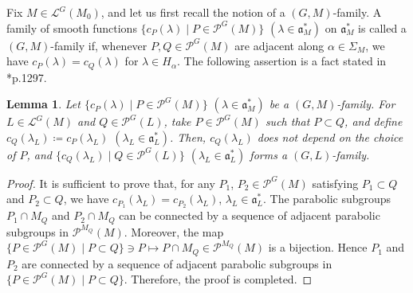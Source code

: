 \documentclass[12pt]{amsart}
\theoremstyle{definition}
\theoremstyle{plain}
\newtheorem{lemma}[definition]{Lemma}
\theoremstyle{remark}
\newcommand{\fa}{\mathfrak{a}}
\newcommand{\cL}{\mathcal{L}}
\newcommand{\cP}{\mathcal{P}}
\numberwithin{equation}{section}
\begin{document}
Fix $M\in\cL^G(M_0)$, and let us first recall the notion of a $(G,M)$-family.
A family of smooth functions $\{c_P(\lambda)\mid P\in\cP^G(M)\}$ 
$(\lambda\in \fa_M^*)$ on $\fa_M^*$ is called a $(G,M)$-family if,
whenever $P, Q\in\cP^G(M)$ are adjacent along $\alpha\in\Sigma_M$, 
we have $c_P(\lambda)=c_Q(\lambda)$ for $\lambda\in H_\alpha$.
The following assertion is a fact stated in \cite{Art82}*{p.1297}.
\begin{lemma}\label{lem:GM}
Let $\{c_P(\lambda)\mid P\in\cP^G(M)\}$ $(\lambda\in \fa_M^*)$ be a $(G,M)$-family.
For $L\in \cL^G(M)$ and $Q\in \cP^G(L)$, take $P\in\cP^G(M)$ such that $P\subset Q$, and define $c_Q(\lambda_L)\coloneqq c_P(\lambda_L)$ $(\lambda_L\in\fa_L^*)$.
Then, $c_Q(\lambda_L)$ does not depend on the choice of $P$, and $\{c_Q(\lambda_L)\mid Q\in\cP^G(L)\}$ $(\lambda_L\in \fa_L^*)$ forms a $(G,L)$-family.
\end{lemma}
\begin{proof}    
It is sufficient to prove that, for any $P_1$, $P_2\in\cP^G(M)$ satisfying $P_1\subset Q$ and $P_2\subset Q$, we have $c_{P_1}(\lambda_L)=c_{P_2}(\lambda_L)$, $\lambda_L\in \fa_L^*$. 
The parabolic subgroups $P_1\cap M_Q$ and $P_2\cap M_Q$ can be connected by a sequence of adjacent parabolic subgroups in $\cP^{M_Q}(M)$.
Moreover, the map
$\{P\in \cP^G(M)\mid P\subset Q\}\ni P\mapsto P\cap M_Q\in \cP^{M_Q}(M)$
is a bijection.
Hence $P_1$ and $P_2$ are connected by a sequence of adjacent parabolic subgroups in $\{P\in \cP^G(M)\mid P\subset Q\}$.
Therefore, the proof is completed.
\end{proof}
\end{document}
